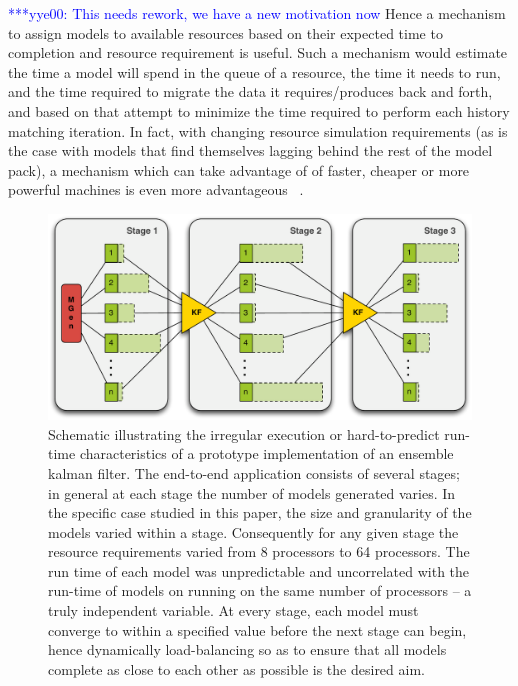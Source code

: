 \documentclass[conference,final]{IEEEtran}
\newcommand{\yyenote}[1]{ {\textcolor{blue} { ***yye00: #1 }}}
\begin{document}
\yyenote{This needs rework, we have a new motivation now} Hence a
mechanism to assign models to available resources based on their
expected time to completion and resource requirement is useful.  Such
a mechanism would estimate the time a model will spend in the queue of
a resource, the time it needs to run, and the time required to migrate
the data it requires/produces back and forth, and based on that
attempt to minimize the time required to perform each history matching
iteration.  In fact, with changing resource simulation requirements
(as is the case with models that find themselves lagging behind the
rest of the model pack), a mechanism which can take advantage of of
faster, cheaper or more powerful machines is even more advantageous
~\cite{escience07}.

\begin{figure}
\begin{center}
\includegraphics*[scale=0.36,]{./figures/3StageKalmanFilter}
\end{center}
\caption{Schematic illustrating the irregular execution or
  hard-to-predict run-time characteristics of a prototype
  implementation of an ensemble kalman filter. The end-to-end
  application consists of several stages; in general at each stage the
  number of models generated varies. In the specific case studied in
  this paper, the size and granularity of the models varied within a
  stage. Consequently for any given stage the resource requirements
  varied from 8 processors to 64 processors.  The run time of each
  model was unpredictable and uncorrelated with the run-time of models
  on running on the same number of processors -- a truly independent
  variable. At every stage, each model must converge to within a
  specified value before the next stage can begin, hence dynamically
  load-balancing so as to ensure that all models complete as close to
  each other as possible is the desired aim.}
\label{fig:irregular_execution}
\end{figure}
\end{document}
